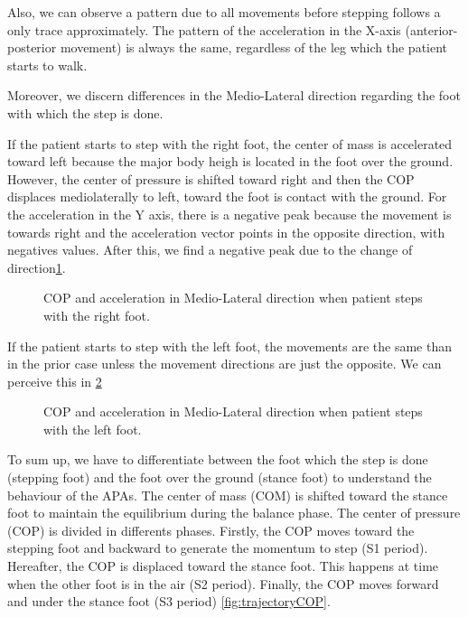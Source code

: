 Also, we can observe a pattern due to all movements before stepping follows a only trace approximately. The pattern of the acceleration in the X-axis (anterior-posterior movement) is always the same, regardless of the leg which the patient starts to walk.

Moreover, we discern differences in the Medio-Lateral direction regarding the foot with which the step is done. 

If the patient starts to step with the right foot, the center of mass is accelerated toward left because the major body heigh is located in the foot over the ground. However, the center of pressure is shifted toward right and then the COP displaces mediolaterally to left, toward the foot is contact with the ground. For the acceleration in the Y axis, there is a negative peak because the movement is towards right and the acceleration vector points in the opposite direction, with negatives values. After this, we find a negative peak due to the change of direction\ref{fig:ML_AccY_right}. 

\begin{figure}[H]
	\centering
	\caption{COP and acceleration in Medio-Lateral direction when patient steps with the right foot.}
	\label{fig:ML_AccY_right}
\end{figure}

If the patient starts to step with the left foot, the movements are the same than in the prior case unless the movement directions are just the opposite. We can perceive this in \ref{fig:ML_AccY_left}

\begin{figure}[H]
	\centering
	\caption{COP and acceleration in Medio-Lateral direction when patient steps with the left foot.}
	\label{fig:ML_AccY_left}
\end{figure}

To sum up, we have to differentiate between the foot which the step is done (stepping foot) and the foot over the ground (stance foot) to understand the behaviour of the APAs. The center of mass (COM) is shifted toward the stance foot to maintain the equilibrium during the balance phase. The center of pressure (COP) is divided in differents phases. Firstly, the COP moves toward the stepping foot and backward to generate the momentum to step (S1 period). Hereafter, the COP is displaced toward the stance foot. This happens at time when the other foot is in the air (S2 period). Finally, the COP moves forward and under the stance foot (S3 period) \ref{fig:trajectoryCOP}.

